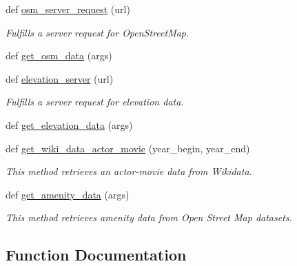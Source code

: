 \begin{DoxyCompactItemize}
def \hyperlink{namespacebridges_1_1data__src__dependent_1_1data__source_a5644517c9ee0f5ab9e59a4f4d64fa038}{osm\+\_\+server\+\_\+request} (url)
\begin{DoxyCompactList}\small\item\em Fulfills a server request for Open\+Street\+Map. \end{DoxyCompactList}\item 
def \hyperlink{namespacebridges_1_1data__src__dependent_1_1data__source_acbb9052453e120b99ac32b27fd99bb07}{get\+\_\+osm\+\_\+data} (args)
\item 
def \hyperlink{namespacebridges_1_1data__src__dependent_1_1data__source_a5232b70889e93385e68a7cd1b296123e}{elevation\+\_\+server} (url)
\begin{DoxyCompactList}\small\item\em Fulfills a server request for elevation data. \end{DoxyCompactList}\item 
def \hyperlink{namespacebridges_1_1data__src__dependent_1_1data__source_a5193a0d8e1507b1cedb5de65f1d702bd}{get\+\_\+elevation\+\_\+data} (args)
\item 
def \hyperlink{namespacebridges_1_1data__src__dependent_1_1data__source_a15db0d52db8b6e096db60f99b2f0171d}{get\+\_\+wiki\+\_\+data\+\_\+actor\+\_\+movie} (year\+\_\+begin, year\+\_\+end)
\begin{DoxyCompactList}\small\item\em This method retrieves an actor-\/movie data from Wikidata. \end{DoxyCompactList}\item 
def \hyperlink{namespacebridges_1_1data__src__dependent_1_1data__source_a98f06111d9c824dbbe49a44e002ceed5}{get\+\_\+amenity\+\_\+data} (args)
\begin{DoxyCompactList}\small\item\em This method retrieves amenity data from Open Street Map datasets. \end{DoxyCompactList}\end{DoxyCompactItemize}


\subsection{Function Documentation}
\mbox{\label{namespacebridges_1_1data__src__dependent_1_1data__source_a5232b70889e93385e68a7cd1b296123e}} 
